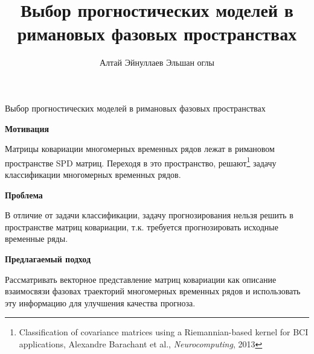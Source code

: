 \documentclass{beamer}
\title[\hbox to 56mm{Попарное расстояние}]{Выбор прогностических моделей в римановых фазовых пространствах}
\author[Эйнуллаев]{Алтай Эйнуллаев Эльшан оглы}
\institute{Московский физико-технический институт}
\date{\footnotesize
\par\smallskip\emph{Научный руководитель:} д.ф-м.н. Стрижов Вадим Викторович
\par\bigskip\small 2024}
\begin{document}
\begin{frame}
\thispagestyle{empty}
\maketitle
\end{frame}
\begin{frame}{Выбор прогностических моделей в римановых фазовых пространствах}

\small
\textbf{Мотивация}

Матрицы ковариации многомерных временных рядов лежат в римановом пространстве SPD матриц. Переходя в это пространство, решают\footnote{Classification of covariance matrices using a Riemannian-based kernel for BCI applications, Alexandre Barachant et al., \textit{Neurocomputing}, 2013} задачу классификации многомерных временных рядов. 

\textbf{Проблема}

В отличие от задачи классификации, задачу прогнозирования нельзя решить в пространстве матриц ковариации, т.к. требуется прогнозировать исходные временные ряды.

\textbf{Предлагаемый подход}

Рассматривать векторное представление матриц ковариации как описание взаимосвязи фазовах траекторий многомерных временных рядов и использовать эту информацию для улучшения качества прогноза.
\end{frame}
\end{document}
